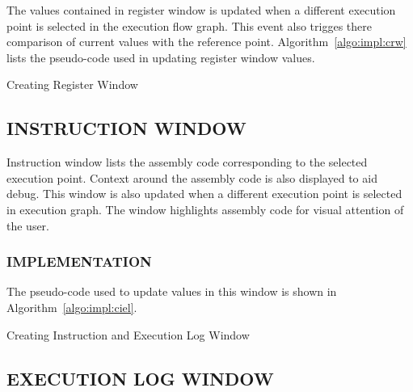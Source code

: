 The values contained in register window is updated when a different execution point is selected in the execution flow graph. This event also trigges there comparison of current values with the reference point. Algorithm~\ref{algo:impl:crw} lists the pseudo-code used in updating register window values.

\IncMargin{1em}
\begin{algorithm}[h]
\DontPrintSemicolon
{} 
\BlankLine
{}
\caption{Creating Register Window}
\label{algo:impl:crw}
\end{algorithm}\DecMargin{1em}

\subsection {INSTRUCTION WINDOW}

Instruction window lists the assembly code corresponding to the selected execution point. Context around the assembly code is also displayed to aid debug. This window is also updated when a different execution point is selected in execution graph. The window highlights assembly code for visual attention of the user.

\subsubsection{IMPLEMENTATION}

The pseudo-code used to update values in this window is shown in Algorithm~\ref{algo:impl:ciel}.

\IncMargin{1em}
\begin{algorithm}[h]
\DontPrintSemicolon
{} 
\caption{Creating Instruction and Execution Log Window}
\label{algo:impl:ciel}
\end{algorithm}\DecMargin{1em}

\subsection {EXECUTION LOG WINDOW}

